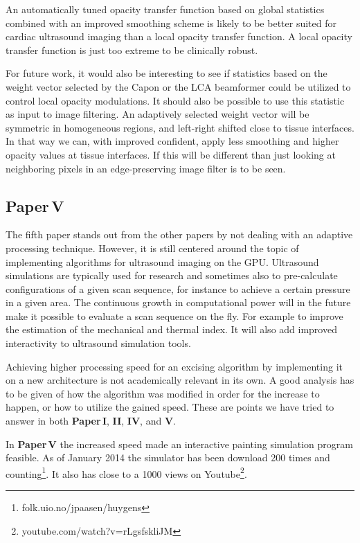 An automatically tuned opacity transfer function based on global statistics combined with an improved smoothing scheme is likely to be better suited for cardiac ultrasound imaging than a local opacity transfer function. A local opacity transfer function is just too extreme to be clinically robust. 

For future work, it would also be interesting to see if statistics based on the weight vector selected by the Capon or the LCA beamformer could be utilized to control local opacity modulations. It should also be possible to use this statistic as input to image filtering. An adaptively selected weight vector will be symmetric in homogeneous regions, and left-right shifted close to tissue interfaces. In that way we can, with improved confident, apply less smoothing and higher opacity values at tissue interfaces. If this will be different than just looking at neighboring pixels in an edge-preserving image filter is to be seen.

\subsection{Paper\,V}
The fifth paper stands out from the other papers by not dealing with an adaptive processing technique. However, it is still centered around the topic of implementing algorithms for ultrasound imaging on the GPU. Ultrasound simulations are typically used for research and sometimes also to pre-calculate configurations of a given scan sequence, for instance to achieve a certain pressure in a given area. The continuous growth in computational power will in the future make it possible to evaluate a scan sequence on the fly. For example to improve the estimation of the mechanical and thermal index. It will also add improved interactivity to ultrasound simulation tools. 

Achieving higher processing speed for an excising algorithm by implementing it on a new architecture is not academically relevant in its own. A good analysis has to be given of how the algorithm was modified in order for the increase to happen, or how to utilize the gained speed. These are points we have tried to answer in both \textbf{Paper\,I}, \textbf{II},  \textbf{IV}, and \textbf{V}.  

In \textbf{Paper\,V} the increased speed made an interactive painting simulation program feasible. As of January 2014 the simulator has been download 200 times and counting\footnote{folk.uio.no/jpaasen/huygens}. It also has close to a 1000 views on Youtube\footnote{youtube.com/watch?v=rLgsfskliJM}.

